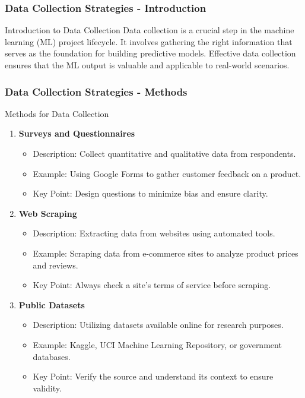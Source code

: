 \documentclass[aspectratio=169]{beamer}
\begin{document}
\begin{frame}[fragile]
    \frametitle{Data Collection Strategies - Introduction}
    \begin{block}{Introduction to Data Collection}
        Data collection is a crucial step in the machine learning (ML) project lifecycle. It involves gathering the right information that serves as the foundation for building predictive models. Effective data collection ensures that the ML output is valuable and applicable to real-world scenarios.
    \end{block}
\end{frame}

\begin{frame}[fragile]
    \frametitle{Data Collection Strategies - Methods}
    \begin{block}{Methods for Data Collection}
        \begin{enumerate}
            \item \textbf{Surveys and Questionnaires}
                \begin{itemize}
                    \item Description: Collect quantitative and qualitative data from respondents.
                    \item Example: Using Google Forms to gather customer feedback on a product.
                    \item Key Point: Design questions to minimize bias and ensure clarity.
                \end{itemize}
                
            \item \textbf{Web Scraping}
                \begin{itemize}
                    \item Description: Extracting data from websites using automated tools.
                    \item Example: Scraping data from e-commerce sites to analyze product prices and reviews.
                    \item Key Point: Always check a site's terms of service before scraping.
                \end{itemize}
                
            \item \textbf{Public Datasets}
                \begin{itemize}
                    \item Description: Utilizing datasets available online for research purposes.
                    \item Example: Kaggle, UCI Machine Learning Repository, or government databases.
                    \item Key Point: Verify the source and understand its context to ensure validity.
                \end{itemize}
                

\end{enumerate}
\end{block}
\end{frame}
\end{document}

